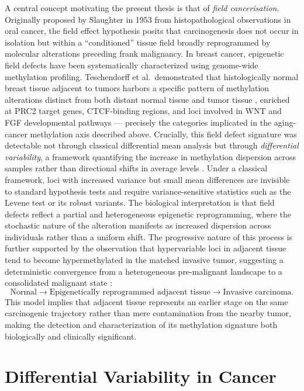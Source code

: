 A central concept motivating the present thesis is that of \textit{field
cancerisation}. Originally proposed by Slaughter in 1953 from histopathological
observations in oral cancer, the field effect hypothesis posits that
carcinogenesis does not occur in isolation but within a ``conditioned'' tissue
field broadly reprogrammed by molecular alterations preceding frank malignancy.
In breast cancer, epigenetic field defects have been systematically characterized
using genome-wide methylation profiling. Teschendorff et al.\ demonstrated that
histologically normal breast tissue adjacent to tumors harbors a specific pattern
of methylation alterations distinct from both distant normal tissue and tumor
tissue \cite{Teschendorff2016fielddefects}, enriched at PRC2 target genes, CTCF-binding
regions, and loci involved in WNT and FGF developmental pathways — precisely
the categories implicated in the aging-cancer methylation axis described above.
Crucially, this field defect signature was detectable not through classical
differential mean analysis but through \textit{differential variability}, a
framework quantifying the increase in methylation dispersion across samples
rather than directional shifts in average levels \cite{Teschendorff2016fielddefects,Teschendorff2014}.
Under a classical framework, loci with increased variance but small mean
differences are invisible to standard hypothesis tests and require
variance-sensitive statistics such as the Levene test or its robust variants.
The biological interpretation is that field defects reflect a partial and
heterogeneous epigenetic reprogramming, where the stochastic nature of the
alteration manifests as increased dispersion across individuals rather than
a uniform shift.
The progressive nature of this process is further supported by the observation
that hypervariable loci in adjacent tissue tend to become hypermethylated in
the matched invasive tumor, suggesting a deterministic convergence from a
heterogeneous pre-malignant landscape to a consolidated malignant state
\cite{Teschendorff2016fielddefects}:
\[
\text{Normal} \rightarrow
\text{Epigenetically reprogrammed adjacent tissue} \rightarrow
\text{Invasive carcinoma}.
\]
This model implies that adjacent tissue represents an earlier stage on the
same carcinogenic trajectory rather than mere contamination from the nearby
tumor, making the detection and characterization of its methylation signature
both biologically and clinically significant.

\section{Differential Variability in Cancer}

